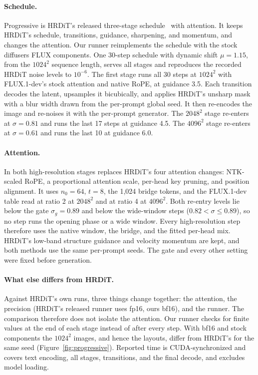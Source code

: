 \paragraph{Schedule.} Progressive \sca{} is HRDiT's released three-stage schedule~\citep{xue2026hrdit} with \sca{} attention. It keeps HRDiT's schedule, transitions, guidance, sharpening, and momentum, and changes the attention. Our runner reimplements the schedule with the stock diffusers FLUX components. One 30-step schedule with dynamic shift $\mu=1.15$, from the $1024^2$ sequence length, serves all stages and reproduces the recorded HRDiT noise levels to $10^{-6}$. The first stage runs all 30 steps at $1024^2$ with FLUX.1-dev's stock attention and native RoPE, at guidance 3.5. Each transition decodes the latent, upsamples it bicubically, and applies HRDiT's unsharp mask with a blur width drawn from the per-prompt global seed. It then re-encodes the image and re-noises it with the per-prompt generator. The $2048^2$ stage re-enters at $\sigma=0.81$ and runs the last 17 steps at guidance 4.5. The $4096^2$ stage re-enters at $\sigma=0.61$ and runs the last 10 at guidance 6.0.

\paragraph{Attention.} In both high-resolution stages \sca{} replaces HRDiT's four attention changes: NTK-scaled RoPE, a proportional attention scale, per-head key pruning, and position alignment. It uses $n_0=64$, $t=8$, the 1,024 bridge tokens, and the FLUX.1-dev table read at ratio 2 at $2048^2$ and at ratio 4 at $4096^2$. Both re-entry levels lie below the gate $\sigma_g=0.89$ and below the wide-window steps ($0.82<\sigma\le0.89$), so no step runs the opening phase or a wide window. Every high-resolution step therefore uses the native window, the bridge, and the fitted per-head mix. HRDiT's low-band structure guidance and velocity momentum are kept, and both methods use the same per-prompt seeds. The gate and every other setting were fixed before generation.

\paragraph{What else differs from HRDiT.} Against HRDiT's own runs, three things change together: the attention, the precision (HRDiT's released runner uses fp16, ours bf16), and the runner. The comparison therefore does not isolate the attention. Our runner checks for finite values at the end of each stage instead of after every step. With bf16 and stock components the $1024^2$ images, and hence the layouts, differ from HRDiT's for the same seed (Figure~\ref{fig:progressive}). Reported time is CUDA-synchronized and covers text encoding, all stages, transitions, and the final decode, and excludes model loading.

